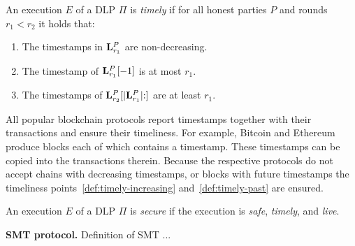 \begin{definition}[Timely]\label{def:timely}
  An execution $E$ of a DLP $\Pi$ is \emph{timely} if for all honest parties $P$
  and rounds $r_1 < r_2$ it holds that:

  \begin{enumerate}
    \item The timestamps in $\mathbf{L}^P_{r_1}$ are non-decreasing.\label{def:timely-increasing}
    \item The timestamp of $\mathbf{L}^P_{r_1}[-1]$ is at most $r_1$.\label{def:timely-past}
    \item The timestamps of $\mathbf{L}^P_{r_2}[|\mathbf{L}^P_{r_1}|{:}]$ are at least $r_1$.\label{def:timely-chunk}
  \end{enumerate}
\end{definition}

All popular blockchain protocols report timestamps together with their
transactions and ensure their timeliness. For example, Bitcoin and Ethereum
produce blocks each of which contains a timestamp. These timestamps can be copied
into the transactions therein. Because the respective protocols do not accept
chains with decreasing timestamps, or blocks with future timestamps the timeliness
points~\ref{def:timely-increasing} and~\ref{def:timely-past} are ensured.


\begin{definition}[Secure]
  An execution $E$ of a DLP $\Pi$ is \emph{secure} if the execution
  is \emph{safe}, \emph{timely}, and \emph{live}.
\end{definition}

\noindent
\textbf{SMT protocol.}
Definition of SMT ...
